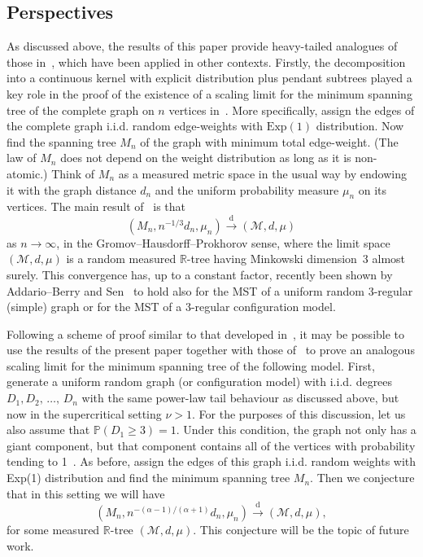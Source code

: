 \documentclass[AHL,Unicode,longabstracts,published]{cedram}
\newcommand{\Prob}[1]{\ensuremath{\mathbb{P} \left(#1 \right)}}
\newcommand{\convdist}{\ensuremath{\overset{\mathrm{d}}{\rightarrow}}}
\newcommand{\cM}{\mathcal{M}}
\newcommand{\R}{\mathbb{R}}
\newcommand{\R}{\mathbb{R}}
\begin{document}
\subsection{Perspectives}
As discussed above, the results of this paper provide heavy-tailed analogues of those in~\cite{ABBrGo}, which have been applied in other contexts. Firstly, the decomposition into a continuous kernel with explicit distribution plus pendant subtrees played a key role in the proof of the existence of a scaling limit for the minimum spanning tree of the complete graph on $n$ vertices in~\cite{ABBrGoMi}. More specifically, assign the edges of the complete graph i.i.d. random edge-weights with $\mathrm{Exp}(1)$ distribution. Now find the spanning tree $M_n$ of the graph with minimum total edge-weight. (The law of $M_n$ does not depend on the weight distribution as long as it is non-atomic.) Think of $M_n$ as a measured metric space in the usual way by endowing it with the graph distance $d_n$ and the uniform probability measure $\mu_n$ on its vertices. The main result of~\cite{ABBrGoMi} is that
\[
\left(M_n, n^{-1/3} d_n, \mu_n\right) \convdist \left(\cM, d, \mu\right)
\]
as $n \to \infty$, in the Gromov--Hausdorff--Prokhorov sense, where the limit space $(\cM,d,\mu)$ is a random measured $\R$-tree having Minkowski dimension~3 almost surely. This convergence has, up to a constant factor, recently been shown by Addario--Berry and Sen~\cite{ABSen} to hold also for the MST of a uniform random 3-regular (simple) graph or for the MST of a 3-regular configuration model.

Following a scheme of proof similar to that developed in~\cite{ABBrGoMi}, it may be possible to use the results of the present paper together with those of~\cite{CKG17+} to prove an analogous scaling limit for the minimum spanning tree of the following model. First, generate a uniform random graph (or configuration model) with i.i.d. degrees $D_1, D_2,\, \ldots,\,D_n$ with the same power-law tail behaviour as discussed above, but now in the supercritical setting $\nu > 1$. For the purposes of this discussion, let us also assume that $\Prob{D_1 \ge 3} = 1$. Under this condition, the graph not only has a giant component, but that component contains all of the vertices with probability tending to 1~\cite[Lemma~1.2]{ChatterjeeDurrett}. As before, assign the edges of this graph i.i.d. random weights with Exp(1) distribution and find the minimum spanning tree $M_n$. Then we conjecture that in this setting we will have
\[
\left(M_n, n^{-(\alpha-1)/(\alpha+1)} d_n, \mu_n\right) \convdist \left(\cM, d, \mu\right),
\]
for some measured $\R$-tree $(\cM,d,\mu)$. This conjecture will be the topic of future work.
\end{document}
